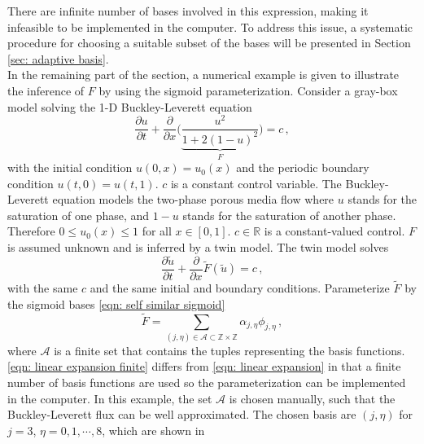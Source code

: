 There are infinite number of bases involved
in this expression, making it infeasible to be implemented in the computer. To address this issue,
a systematic procedure for choosing
a suitable subset of the bases %
will be presented in Section \ref{sec: adaptive basis}.\\


In the remaining part of the section, a numerical example is given to illustrate the inference
of $F$ by using the sigmoid parameterization.
Consider a gray-box model solving the 1-D Buckley-Leverett equation
\cite{Buckley Leverett}
\begin{equation}
    \frac{\partial u}{\partial t} + \frac{\partial}{\partial x}\Big(\underbrace{
    \frac{u^2}{1+ 2(1-u)^2}}_{F} \Big) = c\,,
    \label{eqn: Buckley-Leverett}
\end{equation}
with the initial condition $u(0,x)=u_0(x)$ and the periodic boundary condition $u(t,0)=u(t,1)$. 
$c$ is a constant control variable.
The Buckley-Leverett equation models the two-phase porous media flow where $u$ stands for the
saturation of one phase, and $1-u$ stands for the saturation of another phase. 
Therefore $0 \le u_0(x) \le 1$ for all $x\in [0,1]$. 
$c\in \mathbb{R}$ is a constant-valued control. $F$ is assumed unknown and is inferred by a twin model.
The twin model solves 
\begin{equation}
    \frac{\partial \tilde{u}}{\partial t} + \frac{\partial}{\partial x}\tilde{F}(\tilde{u})
    = c\,,
    \label{eqn: Buckley-Leverett twin}
\end{equation}
with the same $c$ and the same initial and boundary conditions. Parameterize $\tilde{F}$ by
the sigmoid bases \eqref{eqn: self similar sigmoid}
\begin{equation}
    \tilde{F} = \sum_{(j, \eta)\in \mathcal{A}\subset \mathbb{Z}\times \mathbb{Z}} 
                       \alpha_{{j}, {\eta}}
                       \phi_{{j}, {\eta}}\,,
    \label{eqn: linear expansion finite}
\end{equation}
where $\mathcal{A}$ is a finite set that contains the tuples representing
the basis functions. \eqref{eqn: linear expansion finite} differs from 
\eqref{eqn: linear expansion} in that a finite number of basis functions are used so
the parameterization can be implemented in the computer. In this example, the set $\mathcal{A}$
is chosen manually, such that the Buckley-Leverett flux can be well approximated.
The chosen basis are $(j, \eta)$ for $j=3$, $\eta=0,1,\cdots, 8$, which are shown in 

